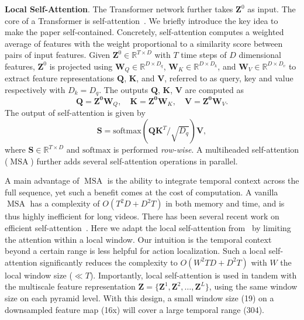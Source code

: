 \smallskip
\noindent \textbf{Local Self-Attention}. The Transformer network further takes $\mathbf{Z}^0$ as input. The core of a Transformer is  self-attention~\cite{transformernips2017}. We briefly introduce the key idea to make the paper self-contained. Concretely, self-attention computes a weighted average of features with the weight proportional to a similarity score between pairs of input features. Given $\mathbf{Z}^0 \in \mathbb{R}^{T \times D}$ with $T$ time steps of $D$ dimensional features, $\mathbf{Z}^0$ is projected using $\mathbf{W}_Q \in \mathbb{R}^{D \times D_q}$, $\mathbf{W}_K \in \mathbb{R}^{D \times D_k}$, and $\mathbf{W}_V \in \mathbb{R}^{D\times D_v}$ to extract feature representations $\mathbf{Q}$, $\mathbf{K}$, and $\mathbf{V}$, referred to as query, key and value respectively with $D_k = D_q$. The outputs $\mathbf{Q}$, $\mathbf{K}$, $\mathbf{V}$ are computed as
\begin{equation}
    \mathbf{Q} = \mathbf{\mathbf{Z}^0} \mathbf{W}_Q, \quad
    \mathbf{K} = \mathbf{\mathbf{Z}^0} \mathbf{W}_K, \quad
    \mathbf{V} = \mathbf{\mathbf{Z}^0} \mathbf{W}_V.
\end{equation}%
The output of self-attention is given by
\begin{equation}\label{eq:trueatten}
    \mathbf{S} = \text{softmax}\left( \mathbf{Q} \mathbf{K}^T / \sqrt{D_q} \right) \mathbf{V},
\end{equation}%
where $\mathbf{S}\in \mathbb{R}^{T \times D}$ and $\text{softmax}$ is performed {\it row-wise}. A multiheaded self-attention ($\operatorname{MSA}$) further adds several self-attention operations in parallel. 

A main advantage of $\operatorname{MSA}$ is the ability to integrate temporal context across the full sequence, yet such a benefit comes at the cost of computation. A vanilla $\operatorname{MSA}$ has a complexity of $O(T^2D + D^2T)$ in both memory and time, and is thus highly inefficient for long videos. There has been several recent work on efficient self-attention~\cite{xiong2021nystromformer,Beltagy2020Longformer,wang2020linformer,choromanski2020rethinking}. Here we adapt the local self-attention from~\cite{choromanski2020rethinking} by limiting the attention within a local window. Our intuition is the temporal context beyond a certain range is less helpful for action localization. Such a local self-attention significantly reduces the complexity to $O(W^2TD + D^2T)$ with $W$ the local window size ($\ll T$). Importantly, local self-attention is used in tandem with the multiscale feature representation $\mathbf{Z}=\{\mathbf{Z}^1, \mathbf{Z}^2, \ldots, \mathbf{Z}^L\}$, using the same window size on each pyramid level. With this design, a small window size (19) on a downsampled feature map (16x) will cover a large temporal range (304). 

